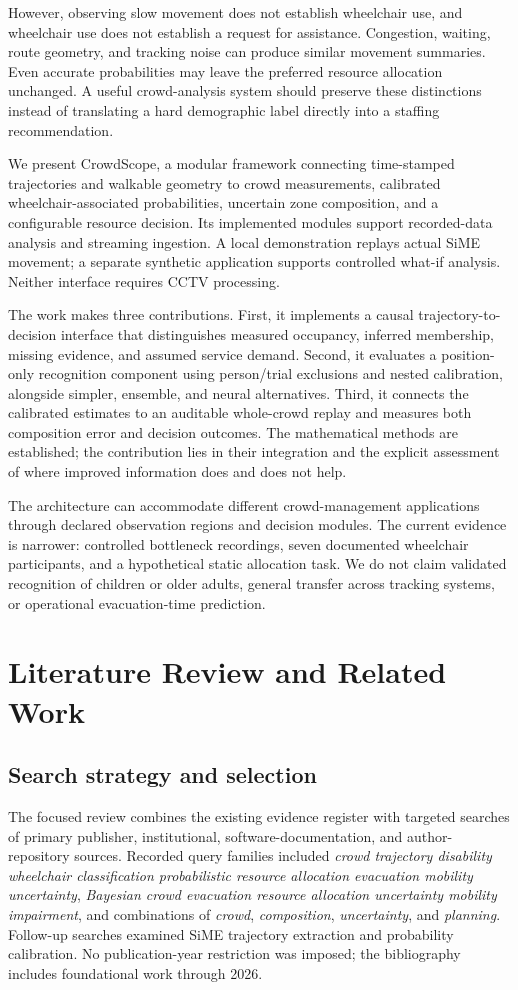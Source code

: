 \documentclass[conference]{IEEEtran}
\newcommand{\framework}{CrowdScope}
\begin{document}
However, observing slow movement does not establish wheelchair use, and wheelchair use does not establish a request for assistance. Congestion, waiting, route geometry, and tracking noise can produce similar movement summaries. Even accurate probabilities may leave the preferred resource allocation unchanged. A useful crowd-analysis system should preserve these distinctions instead of translating a hard demographic label directly into a staffing recommendation.

We present \framework, a modular framework connecting time-stamped trajectories and walkable geometry to crowd measurements, calibrated wheelchair-associated probabilities, uncertain zone composition, and a configurable resource decision. Its implemented modules support recorded-data analysis and streaming ingestion. A local demonstration replays actual SiME movement; a separate synthetic application supports controlled what-if analysis. Neither interface requires CCTV processing.

The work makes three contributions. First, it implements a causal trajectory-to-decision interface that distinguishes measured occupancy, inferred membership, missing evidence, and assumed service demand. Second, it evaluates a position-only recognition component using person/trial exclusions and nested calibration, alongside simpler, ensemble, and neural alternatives. Third, it connects the calibrated estimates to an auditable whole-crowd replay and measures both composition error and decision outcomes. The mathematical methods are established; the contribution lies in their integration and the explicit assessment of where improved information does and does not help.

The architecture can accommodate different crowd-management applications through declared observation regions and decision modules. The current evidence is narrower: controlled bottleneck recordings, seven documented wheelchair participants, and a hypothetical static allocation task. We do not claim validated recognition of children or older adults, general transfer across tracking systems, or operational evacuation-time prediction.

\section{Literature Review and Related Work}
\subsection{Search strategy and selection}
The focused review combines the existing evidence register with targeted searches of primary publisher, institutional, software-documentation, and author-repository sources. Recorded query families included \emph{crowd trajectory disability wheelchair classification probabilistic resource allocation evacuation mobility uncertainty}, \emph{Bayesian crowd evacuation resource allocation uncertainty mobility impairment}, and combinations of \emph{crowd}, \emph{composition}, \emph{uncertainty}, and \emph{planning}. Follow-up searches examined SiME trajectory extraction and probability calibration. No publication-year restriction was imposed; the bibliography includes foundational work through 2026.
\end{document}
